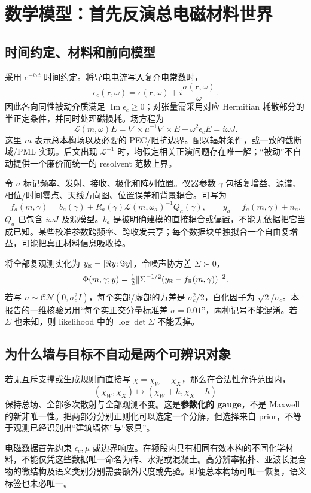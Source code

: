 \section{数学模型：首先反演总电磁材料世界}
\subsection{时间约定、材料和前向模型}
采用 $e^{-i\omega t}$ 时间约定。将导电电流写入复介电常数时，
\[
\epsilon_c(\mathbf r,\omega)=\epsilon(\mathbf r,\omega)+
i\frac{\sigma(\mathbf r,\omega)}{\omega}.
\]
因此各向同性被动介质满足 $\operatorname{Im}\epsilon_c\ge0$；对张量需采用对应 Hermitian 耗散部分的半正定条件，并同时处理磁损耗。场方程为
\[
\mathcal L(m,\omega)E
=\nabla\times\mu^{-1}\nabla\times E-\omega^2\epsilon_cE
=i\omega J.
\]
这里 $m$ 表示总本构场以及必要的 PEC/阻抗边界。配以辐射条件，或一致的截断域/PML 实现。后文出现 $\mathcal L^{-1}$ 时，均假定相关正演问题存在唯一解；“被动”不自动提供一个廉价而统一的 resolvent 范数上界。

令 $a$ 标记频率、发射、接收、极化和阵列位置。仪器参数 $\gamma$ 包括复增益、源谱、相位/时间零点、天线方向图、位置误差和背景耦合。可写为
\[
f_a(m,\gamma)=b_a(\gamma)+R_a(\gamma)
\mathcal L(m,\omega_a)^{-1}Q_a(\gamma),\qquad
y_a=f_a(m,\gamma)+n_a.
\]
$Q_a$ 已包含 $i\omega J$ 及源模型。$b_a$ 是被明确建模的直接耦合或偏置，不能无依据把它当成已知。某些校准参数跨频率、跨收发共享；每个数据块单独拟合一个自由复增益，可能把真正材料信息吸收掉。

将全部复观测实化为 $y_{\mathbb R}=[\Re y;\Im y]$，令噪声协方差 $\Sigma\succ0$，
\[
\Phi(m,\gamma;y)=\tfrac12\|\Sigma^{-1/2}(y_\mathbb R-f_\mathbb R(m,\gamma))\|^2.
\]
若写 $n\sim\mathcal{CN}(0,\sigma_c^2I)$，每个实部/虚部的方差是 $\sigma_c^2/2$，白化因子为 $\sqrt2/\sigma_c$。本报告的一维核验另用“每个实正交分量标准差 $\sigma=0.01$”，两种记号不能混淆。若 $\Sigma$ 也未知，则 likelihood 中的 $\log\det\Sigma$ 不能丢掉。

\subsection{为什么墙与目标不自动是两个可辨识对象}
若无互斥支撑或生成规则而直接写 $\chi=\chi_W+\chi_X$，那么在合法性允许范围内，
\[
(\chi_W,\chi_X)\longmapsto(\chi_W+h,\chi_X-h)
\]
保持总场、全部多次散射与全部观测不变。这是\textbf{参数化的 gauge}，不是 Maxwell 的新非唯一性。把两部分分别正则化可以选定一个分解，但选择来自 prior，不等于观测已经识别出“建筑墙体”与“家具”。

电磁数据首先约束 $\epsilon_c,\mu$ 或边界响应。在频段内具有相同有效本构的不同化学材料，不能仅凭这些数据唯一命名为砖、水泥或混凝土。高分辨率拓扑、亚波长混合物的微结构及语义类别分别需要额外尺度或先验。即便总本构场可唯一恢复，语义标签也未必唯一。

